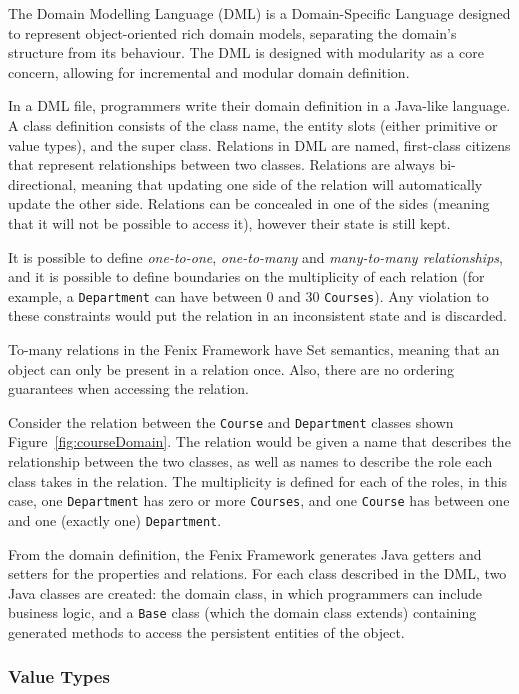 \documentclass{llncs}
\begin{document}
The Domain Modelling Language (DML) is a Domain-Specific Language
designed to represent object-oriented rich domain models, separating
the domain's structure from its behaviour. The DML is designed with
modularity as a core concern, allowing for incremental and modular
domain definition.

In a DML file, programmers write their domain definition in a
Java-like language. A class definition consists of the class name, the
entity slots (either primitive or value types), and the super
class. Relations in DML are named, first-class citizens that represent
relationships between two classes. Relations are always
bi-directional, meaning that updating one side of the relation will
automatically update the other side. Relations can be concealed in one
of the sides (meaning that it will not be possible to access it),
however their state is still kept.

It is possible to define {\it one-to-one}, {\it one-to-many} and {\it
  many-to-many relationships}, and it is possible to define boundaries
on the multiplicity of each relation (for example, a
\texttt{Department} can have between 0 and 30 \texttt{Courses}). Any
violation to these constraints would put the relation in an
inconsistent state and is discarded.

To-many relations in the Fenix Framework have Set semantics, meaning
that an object can only be present in a relation once. Also, there are
no ordering guarantees when accessing the relation.

Consider the relation between the \texttt{Course} and
\texttt{Department} classes shown Figure~\ref{fig:courseDomain}. The
relation would be given a name that describes the relationship between
the two classes, as well as names to describe the role each class
takes in the relation. The multiplicity is defined for each of the
roles, in this case, one \texttt{Department} has zero or more
\texttt{Courses}, and one \texttt{Course} has between one and one
(exactly one) \texttt{Department}.

From the domain definition, the Fenix Framework generates Java getters
and setters for the properties and relations. For each class described
in the DML, two Java classes are created: the domain class, in which
programmers can include business logic, and a \texttt{Base} class
(which the domain class extends) containing generated methods to
access the persistent entities of the object.

\subsubsection{Value Types}
\label{sec:json}
\end{document}
